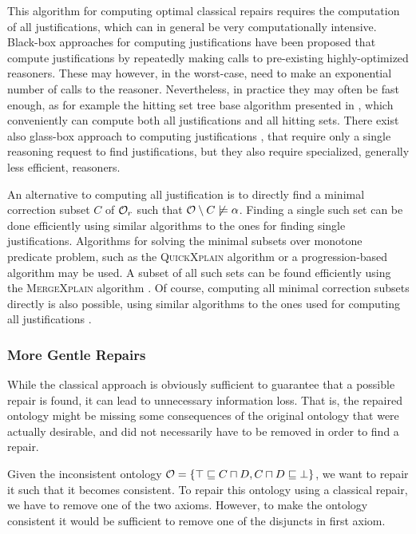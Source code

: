 This algorithm for computing optimal classical repairs requires the computation of all justifications, which can in general be very computationally intensive. Black-box approaches for computing justifications have been proposed \cite{kalyanpur2007finding,schlobach2003non,schlobach2007debugging} that compute justifications by repeatedly making calls to pre-existing highly-optimized reasoners. These may however, in the worst-case, need to make an exponential number of calls to the reasoner. Nevertheless, in practice they may often be fast enough, as for example the hitting set tree base algorithm presented in \cite{kalyanpur2007finding}, which conveniently can compute both all justifications and all hitting sets. There exist also glass-box approach to computing justifications \cite{kalyanpur2007finding}, that require only a single reasoning request to find justifications, but they also require specialized, generally less efficient, reasoners.

An alternative to computing all justification is to directly find a minimal correction subset $C$ of $\mathcal{O}_r$ such that $\mathcal{O} \setminus C \not\models \alpha$. Finding a single such set can be done efficiently using similar algorithms to the ones for finding single justifications. Algorithms for solving the minimal subsets over monotone predicate problem, such as the \textsc{QuickXplain} algorithm \cite{junker2004preferred} or a progression-based algorithm \cite{marques2013minimal} may be used. A subset of all such sets can be found efficiently using the \textsc{MergeXplain} algorithm \cite{shchekotykhin2015mergexplain}. Of course, computing all minimal correction subsets directly is also possible, using similar algorithms to the ones used for computing all justifications \cite{malouf2007maximal}.

\subsubsection{More Gentle Repairs} \label{more-gentle-repairs}

While the classical approach is obviously sufficient to guarantee that a possible repair is found, it can lead to unnecessary information loss. That is, the repaired ontology might be missing some consequences of the original ontology that were actually desirable, and did not necessarily have to be removed in order to find a repair.

\begin{example}
Given the inconsistent ontology $\mathcal{O} = \{ \top \sqsubseteq C \sqcap D, C \sqcap D \sqsubseteq \bot \}$, we want to repair it such that it becomes consistent. To repair this ontology using a classical repair, we have to remove one of the two axioms. However, to make the ontology consistent it would be sufficient to remove one of the disjuncts in first axiom.
\end{example}

